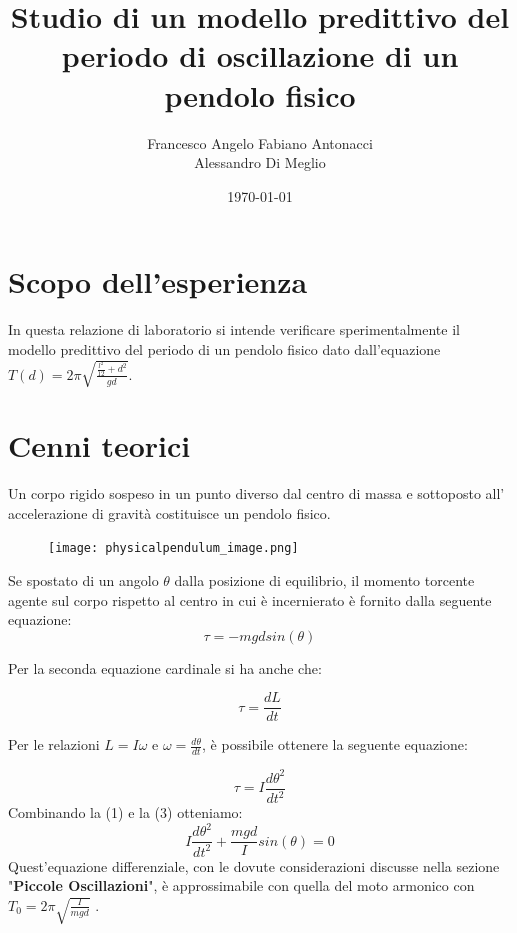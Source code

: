 \documentclass[11pt]{article}
\title{Studio di un modello predittivo del periodo di oscillazione di un pendolo fisico}
\author{Francesco Angelo Fabiano Antonacci\\Alessandro Di Meglio}
\date{\today}
\begin{document}
\maketitle

\section{Scopo dell'esperienza}

In questa relazione di laboratorio si intende verificare sperimentalmente il modello predittivo del periodo di un pendolo fisico dato dall'equazione $T(d)=2\pi\sqrt{\frac{\frac{l^2}{12}+d^2}{gd}}$.

\section{Cenni teorici}

Un corpo rigido sospeso in un punto diverso dal centro di massa e sottoposto all' accelerazione di gravità costituisce un pendolo fisico.
\begin{figure}[htbp]
\centerline{\texttt{[image: physicalpendulum\_image.png]}}

\label{fig}
\end{figure}

Se spostato di un angolo $\theta$ dalla posizione di equilibrio, il momento torcente agente sul corpo rispetto al centro in cui è incernierato è fornito dalla seguente equazione:
\begin{equation}
\tau  = -mgd sin(\theta)
\end{equation}

Per la seconda equazione cardinale si ha anche che:


\begin{equation}
\tau  =\frac{dL}{dt}
\end{equation}

Per le relazioni $L=I\omega  $ e $\omega=\frac{d\theta}{dt}$, è  possibile ottenere la seguente equazione:

\begin{equation}
\tau=I\frac{d\theta^2}{dt^2}
\end{equation}
Combinando la (1) e la (3) otteniamo:
\begin{equation}
I\frac{d\theta^2}{dt^2}+\frac{mgd}{I}sin(\theta)=0
\end{equation}
Quest'equazione differenziale, con le dovute considerazioni discusse nella sezione "\textbf{Piccole Oscillazioni}",
è approssimabile con quella del moto armonico con $T_0=2\pi\sqrt{\frac{I}{mgd}}$ .
\end{document}
